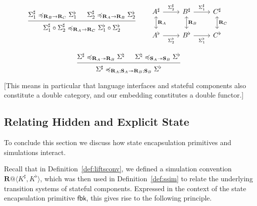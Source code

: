 \documentclass[acmsmall,screen,review,anonymous]{acmart}
\newcommand{\kw}[1]{\ensuremath{ \mathsf{#1} }}
\renewcommand{\preceq}{\preccurlyeq}
\begin{document}
\begin{lemma} \label{thm:slcompsim} %
\[
  \begin{prooftree}
    \hypo{
      \Sigma_1^\sharp
      \preceq_{\mathbf{R}_B \rightarrow \mathbf{R}_C}
      \Sigma_1^\flat}
    \hypo{
      \Sigma_2^\sharp
      \preceq_{\mathbf{R}_A \rightarrow \mathbf{R}_B}
      \Sigma_2^\flat}
    \infer2{
      \Sigma_1^\sharp \circ \Sigma_2^\sharp
      \preceq_{\mathbf{R}_A \rightarrow \mathbf{R}_C}
      \Sigma_1^\flat \circ \Sigma_2^\flat}
  \end{prooftree}
  \qquad
  \begin{tikzcd}
    A^\sharp \ar[r, rightarrow, "\Sigma_2^\sharp"]
	     \ar[d, leftrightarrow, "\mathbf{R}_A"] &
    B^\sharp \ar[r, rightarrow, "\Sigma_1^\sharp"]
	     \ar[d, leftrightarrow, "\mathbf{R}_B"] &
    C^\sharp \ar[d, leftrightarrow, "\mathbf{R}_C"]
    \\
    A^\flat \ar[r, rightarrow, "\Sigma_2^\flat"'] &
    B^\flat \ar[r, rightarrow, "\Sigma_1^\flat"'] &
    C^\flat
  \end{tikzcd}
\]
\end{lemma}

\begin{lemma} \label{thm:svcomp} %
\[
  \begin{prooftree}
    \hypo{\Sigma^\sharp
      \preceq_{\mathbf{R}_A \twoheadrightarrow \mathbf{R}_B}
      \Sigma^\natural}
    \hypo{\Sigma^\natural
      \preceq_{\mathbf{S}_A \twoheadrightarrow \mathbf{S}_B}
      \Sigma^\flat}
    \infer2{\Sigma^\sharp
      \preceq_{\mathbf{R}_A \mathbin; \mathbf{S}_A \twoheadrightarrow
	   \mathbf{R}_B \mathbin; \mathbf{S}_B}
      \Sigma^\flat}
  \end{prooftree}
\]
\end{lemma}

[This means in particular that language interfaces and stateful components
also constitute a double category,
and our embedding constitutes a double functor.]


\subsection{Relating Hidden and Explicit State} %

To conclude this section we discuss how
state encapsulation primitives and simulations interact.

Recall that in Definition~\ref{def:liftsconv}, we defined a simulation convention
$\mathbf{R}@\langle K^\sharp, K^\flat \rangle$,
which was then used in Definition~\ref{def:ssim}
to relate the underlying transition systems
of stateful components.
Expressed in the context of the state encapsulation primitive $\kw{fbk}$,
this gives rise to the following principle.
\end{document}
